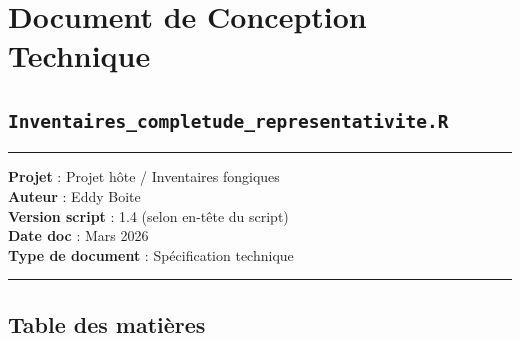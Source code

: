 \section{Document de Conception
Technique}\label{document-de-conception-technique}

\subsection{\texorpdfstring{\texttt{Inventaires\_completude\_representativite.R}}{Inventaires\_completude\_representativite.R}}\label{inventaires_completude_representativite.r}

\begin{center}\rule{0.5\linewidth}{0.5pt}\end{center}

\textbf{Projet} : Projet hôte / Inventaires fongiques\\
\textbf{Auteur} : Eddy Boite\\
\textbf{Version script} : 1.4 (selon en-tête du script)\\
\textbf{Date doc} : Mars 2026\\
\textbf{Type de document} : Spécification technique

\begin{center}\rule{0.5\linewidth}{0.5pt}\end{center}

\subsection{Table des matières}\label{table-des-matiuxe8res}

